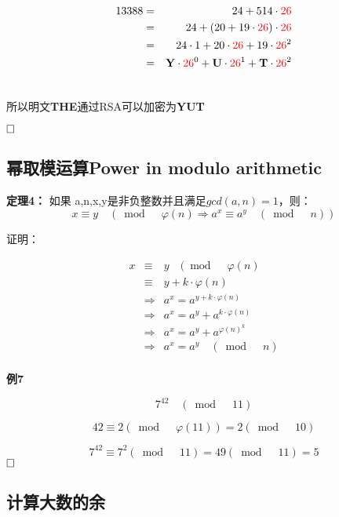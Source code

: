 \documentclass{article}
\begin{document}
\begin{eqnarray}   
\label{eq}
13388&=& 24 + 514 \cdot {\color{red}26}   \nonumber \\ 
&=&  24 + (20 + 19 \cdot {\color{red}26} ) \cdot {\color{red}26}  \nonumber \\ 
&=& 24 \cdot 1 + 20 \cdot {\color{red}26} + 19 \cdot {\color{red}26}^2  \nonumber \\ 
&=& \textbf{Y}\cdot {\color{red}26}^0 + \textbf{U}\cdot {\color{red}26}^1 + \textbf{T}\cdot {\color{red}26}^2 \nonumber \\ 
\nonumber 
\end{eqnarray}

所以明文\textbf{THE}通过RSA可以加密为\textbf{YUT}

$\hfill\square$ 

\subsection{幂取模运算Power in modulo arithmetic}

\textbf{定理4：} 如果 a,n,x,y是非负整数并且满足$gcd(a,n) = 1$，则：
$$x \equiv y \quad (\bmod \quad \varphi(n) \Rightarrow a^x \equiv a^y \quad (\bmod \quad n))$$

证明：


\begin{eqnarray}   
\label{eq}
x &\equiv& y \quad (\bmod \quad \varphi(n)  \nonumber \\ 
&\equiv& y + k \cdot  \varphi(n) \nonumber \\ 
&\Rightarrow& a^x = a^{y + k \cdot  \varphi(n)} \nonumber \\ 
&\Rightarrow& a^x = a^{y} + a^{k \cdot  \varphi(n)} \nonumber \\ 
&\Rightarrow& a^x = a^{y} + a^{\varphi(n)}^k \nonumber \\ 
&\Rightarrow& a^x = a^{y} \quad (\bmod \quad n) \nonumber \\ 
\nonumber 
\end{eqnarray}

\textbf{例7}

$$7^42 \quad (\bmod \quad 11)$$

$$42 \equiv 2  (\bmod \quad \varphi(11)) = 2  (\bmod \quad 10)$$

$$7^42 \equiv 7^2  (\bmod \quad 11) = 49 (\bmod \quad 11) = 5$$
$\hfill\square$ 

\subsection{计算大数的余}
\end{document}
